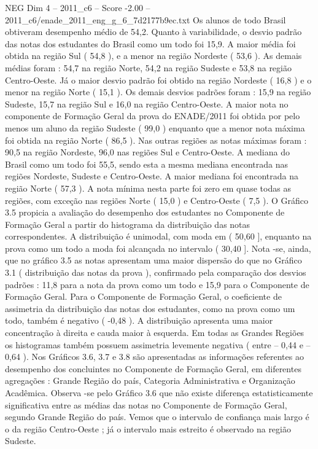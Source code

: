 \begin{textsample}{NEG Dim 4 – 2011\_c6 – Score -2.00 – 2011\_c6/enade\_2011\_eng\_g\_6\_7d2177b9ec.txt}
Os alunos de todo Brasil obtiveram desempenho médio de 54,2.
Quanto à variabilidade, o desvio padrão das notas dos estudantes do Brasil como um todo foi 15,9.
A maior média foi obtida na região Sul ( 54,8 ), e a menor na região Nordeste ( 53,6 ).
As demais médias foram : 54,7 na região Norte, 54,2 na região Sudeste e 53,8 na região Centro-Oeste.
Já o maior desvio padrão foi obtido na região Nordeste ( 16,8 ) e o menor na região Norte ( 15,1 ).
Os demais desvios padrões foram : 15,9 na região Sudeste, 15,7 na região Sul e 16,0 na região Centro-Oeste.
A maior nota no componente de Formação Geral da prova do ENADE/2011 foi obtida por pelo menos um aluno da região Sudeste ( 99,0 ) enquanto que a menor nota máxima foi obtida na região Norte ( 86,5 ).
Nas outras regiões as notas máximas foram : 90,5 na região Nordeste, 96,0 nas regiões Sul e Centro-Oeste.
A mediana do Brasil como um todo foi 55,5, sendo esta a mesma mediana encontrada nas regiões Nordeste, Sudeste e Centro-Oeste.
A maior mediana foi encontrada na região Norte ( 57,3 ).
A nota mínima nesta parte foi zero em quase todas as regiões, com exceção nas regiões Norte ( 15,0 ) e Centro-Oeste ( 7,5 ).
O Gráfico 3.5 propicia a avaliação do desempenho dos estudantes no Componente de Formação Geral a partir do histograma da distribuição das notas correspondentes.
A distribuição é unimodal, com moda em ( 50,60 ], enquanto na prova como um todo a moda foi alcançada no intervalo ( 30,40 ].
Nota -se, ainda, que no gráfico 3.5 as notas apresentam uma maior dispersão do que no Gráfico 3.1 ( distribuição das notas da prova ), confirmado pela comparação dos desvios padrões : 11,8 para a nota da prova como um todo e 15,9 para o Componente de Formação Geral.
Para o Componente de Formação Geral, o coeficiente de assimetria da distribuição das notas dos estudantes, como na prova como um todo, também é negativo ( -0,48 ).
A distribuição apresenta uma maior concentração à direita e cauda maior à esquerda.
Em todas as Grandes Regiões os histogramas também possuem assimetria levemente negativa ( entre – 0,44 e – 0,64 ).
Nos Gráficos 3.6, 3.7 e 3.8 são apresentadas as informações referentes ao desempenho dos concluintes no Componente de Formação Geral, em diferentes agregações : Grande Região do país, Categoria Administrativa e Organização Acadêmica.
Observa -se pelo Gráfico 3.6 que não existe diferença estatisticamente significativa entre as médias das notas no Componente de Formação Geral, segundo Grande Região do país.
Vemos que o intervalo de confiança mais largo é o da região Centro-Oeste ; já o intervalo mais estreito é observado na região Sudeste.

\end{textsample}
